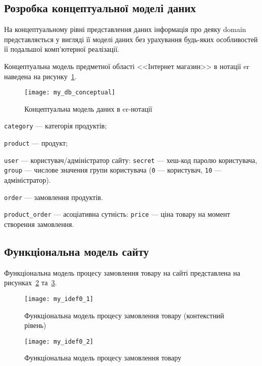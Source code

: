 \subsection{Розробка концептуальної моделі даних}
На концептуальному рівні представлення даних інформація про деяку \acrshort{domain} представляється у вигляді її моделі даних без урахування будь-яких особливостей її подальшої комп'ютерної реалізації.

Концептуальна модель предметної області <<Інтернет магазин>> в нотації \acrshort{er} наведена на рисунку~\ref{fig:my_db_conceptual}.

\begin{figure}[H]
    \centering
    \texttt{[image: my\_db\_conceptual]}
    \caption{Концептуальна модель даних в \acrshort{er}-нотації}
    \label{fig:my_db_conceptual}
\end{figure}
\begin{description}
    \item[де] \texttt{category} --- категорія продуктів;
    \item \texttt{product} --- продукт;
    \item \texttt{user} --- користувач/адміністратор сайту: \texttt{\small secret} --- хеш-код паролю користувача, \texttt{\small group} --- числове значення групи користувача (\texttt{0} --- користувач, \texttt{10} --- адміністратор).
    \item \texttt{order} --- замовлення продуктів.
    \item \texttt{product\_order} --- асоціативна сутність: \texttt{\small price} --- ціна товару на момент створення замовлення.
\end{description}

\subsection{Функціональна модель сайту}
Функціональна модель процесу замовлення товару на сайті представлена на рисунках~\ref{fig:my_idef0_1} та~\ref{fig:my_idef0_2}.
\begin{figure}[H]
    \centering
    \texttt{[image: my\_idef0\_1]}
    \caption{Функціональна модель процесу замовлення товару (контекстний рівень)}
    \label{fig:my_idef0_1}
\end{figure}
\begin{figure}[H]
    \centering 
    \texttt{[image: my\_idef0\_2]}
    \caption{Функціональна модель процесу замовлення товару}
    \label{fig:my_idef0_2}
\end{figure}

